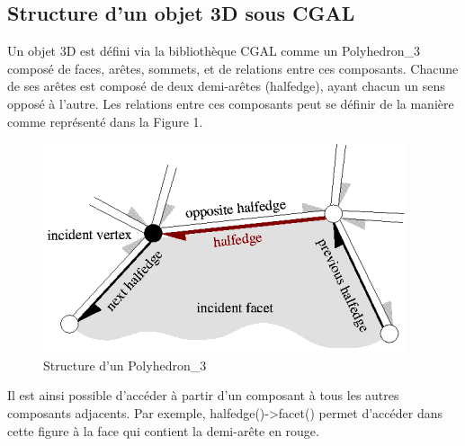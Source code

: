 \documentclass[a4paper,french]{report}
\begin{document}
			\subsection{Structure d'un objet 3D sous CGAL}
				Un objet 3D est défini via la bibliothèque CGAL comme un Polyhedron\_3 composé de faces, arêtes, sommets, et de relations entre ces composants. Chacune de ses arêtes est composé de deux demi-arêtes (halfedge), ayant chacun un sens opposé à l'autre. Les relations entre ces composants peut se définir de la manière comme représenté dans la Figure 1. \par
				\begin{figure}[h]
					\centering
					\includegraphics{halfedge_small.png}
					\caption{Structure d'un Polyhedron\_3}
				\end{figure}
				Il est ainsi possible d'accéder à partir d'un composant à tous les autres composants adjacents. Par exemple, halfedge()-\textgreater facet() permet d'accéder dans cette figure à la face qui contient la demi-arête en rouge.
				
\end{document}
